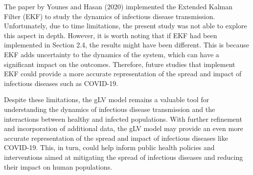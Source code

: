 The paper by Younes and Hasan (2020) implemented the Extended Kalman Filter (EKF) to study the dynamics of infectious disease transmission. Unfortunately, due to time limitations, the present study was not able to explore this aspect in depth. However, it is worth noting that if EKF had been implemented in Section 2.4, the results might have been different. This is because EKF adds uncertainty to the dynamics of the system, which can have a significant impact on the outcomes. Therefore, future studies that implement EKF could provide a more accurate representation of the spread and impact of infectious diseases such as COVID-19.

Despite these limitations, the gLV model remains a valuable tool for understanding the dynamics of infectious disease transmission and the interactions between healthy and infected populations. With further refinement and incorporation of additional data, the gLV model may provide an even more accurate representation of the spread and impact of infectious diseases like COVID-19. This, in turn, could help inform public health policies and interventions aimed at mitigating the spread of infectious diseases and reducing their impact on human populations.